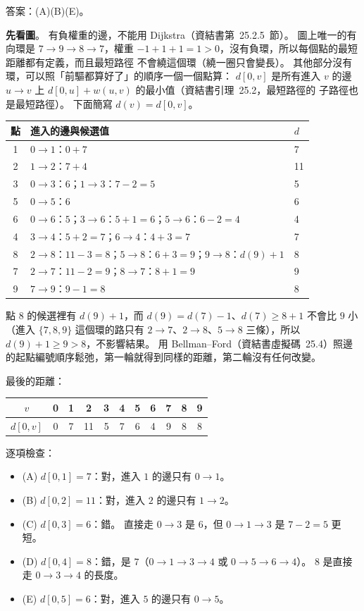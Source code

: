 \begin{pastsoln}
答案：(A)(B)(E)。

\textbf{先看圖}。 有負權重的邊，不能用 Dijkstra（資結書第~25.2.5~節）。 圖上唯一的有向環是
$7 \to 9 \to 8 \to 7$，權重 $-1 + 1 + 1 = 1 > 0$，沒有負環，所以每個點的最短距離都有定義，而且最短路徑
不會繞這個環（繞一圈只會變長）。 其他部分沒有環，可以照「前驅都算好了」的順序一個一個點算：
$d[0,v]$ 是所有進入 $v$ 的邊 $u \to v$ 上 $d[0,u] + w(u,v)$ 的最小值（資結書引理~25.2，最短路徑的
子路徑也是最短路徑）。 下面簡寫 $d(v) = d[0,v]$。
\begin{center}
\small
\begin{tabular}{cll}
\toprule
點 & 進入的邊與候選值 & $d$ \\
\midrule
1 & $0 \to 1$：$0 + 7$ & 7 \\
2 & $1 \to 2$：$7 + 4$ & 11 \\
3 & $0 \to 3$：$6$；$1 \to 3$：$7 - 2 = 5$ & 5 \\
5 & $0 \to 5$：$6$ & 6 \\
6 & $0 \to 6$：$5$；$3 \to 6$：$5 + 1 = 6$；$5 \to 6$：$6 - 2 = 4$ & 4 \\
4 & $3 \to 4$：$5 + 2 = 7$；$6 \to 4$：$4 + 3 = 7$ & 7 \\
8 & $2 \to 8$：$11 - 3 = 8$；$5 \to 8$：$6 + 3 = 9$；$9 \to 8$：$d(9) + 1$ & 8 \\
7 & $2 \to 7$：$11 - 2 = 9$；$8 \to 7$：$8 + 1 = 9$ & 9 \\
9 & $7 \to 9$：$9 - 1 = 8$ & 8 \\
\bottomrule
\end{tabular}
\end{center}
點 $8$ 的候選裡有 $d(9) + 1$，而 $d(9) = d(7) - 1$、$d(7) \ge 8 + 1$ 不會比 $9$ 小（進入 $\{7, 8, 9\}$
這個環的路只有 $2 \to 7$、$2 \to 8$、$5 \to 8$ 三條），所以 $d(9) + 1 \ge 9 > 8$，不影響結果。 用
Bellman--Ford（資結書虛擬碼~25.4）照邊的起點編號順序鬆弛，第一輪就得到同樣的距離，第二輪沒有任何改變。

最後的距離：
\begin{center}
\small
\begin{tabular}{c*{10}{c}}
\toprule
$v$ & 0 & 1 & 2 & 3 & 4 & 5 & 6 & 7 & 8 & 9 \\
\midrule
$d[0,v]$ & 0 & 7 & 11 & 5 & 7 & 6 & 4 & 9 & 8 & 8 \\
\bottomrule
\end{tabular}
\end{center}

逐項檢查：
\begin{itemize}
\item (A) $d[0,1] = 7$：對，進入 $1$ 的邊只有 $0 \to 1$。
\item (B) $d[0,2] = 11$：對，進入 $2$ 的邊只有 $1 \to 2$。
\item (C) $d[0,3] = 6$：錯。 直接走 $0 \to 3$ 是 $6$，但 $0 \to 1 \to 3$ 是 $7 - 2 = 5$ 更短。
\item (D) $d[0,4] = 8$：錯，是 $7$（$0 \to 1 \to 3 \to 4$ 或 $0 \to 5 \to 6 \to 4$）。 $8$ 是直接走
$0 \to 3 \to 4$ 的長度。
\item (E) $d[0,5] = 6$：對，進入 $5$ 的邊只有 $0 \to 5$。
\end{itemize}
\end{pastsoln}
